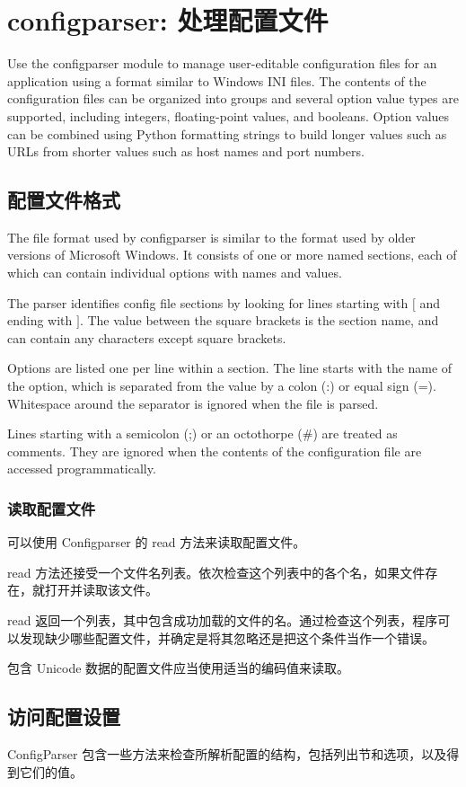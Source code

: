 \section{configparser: 处理配置文件}
Use the configparser module to manage user-editable configuration files for an application using a format similar to Windows INI files. The contents of the configuration files can be organized into groups and several option value types are supported, including integers, floating-point values, and booleans. Option values can be combined using Python formatting strings to build longer values such as URLs from shorter values such as host names and port numbers.
\subsection{配置文件格式}
The file format used by configparser is similar to the format used by older versions of Microsoft Windows. It consists of one or more named sections, each of which can contain individual options with names and values.

The parser identifies config file sections by looking for lines starting with $[$ and ending with $]$. The value between the square brackets is the section name, and can contain any characters except square brackets.

Options are listed one per line within a section. The line starts with the name of the option, which is separated from the value by a colon (:) or equal sign (=). Whitespace around the separator is ignored when the file is parsed.

Lines starting with a semicolon (;) or an octothorpe ($\#$) are treated as comments. They are ignored when the contents of the configuration file are accessed programmatically.
\subsubsection{读取配置文件}
可以使用 Configparser 的 read 方法来读取配置文件。

read 方法还接受一个文件名列表。依次检查这个列表中的各个名，如果文件存在，就打开并读取该文件。

read 返回一个列表，其中包含成功加载的文件的名。通过检查这个列表，程序可以发现缺少哪些配置文件，并确定是将其忽略还是把这个条件当作一个错误。

包含 Unicode 数据的配置文件应当使用适当的编码值来读取。

\subsection{访问配置设置}
ConfigParser 包含一些方法来检查所解析配置的结构，包括列出节和选项，以及得到它们的值。

